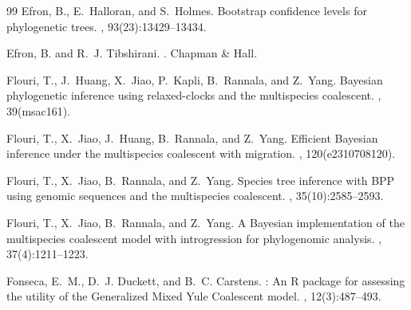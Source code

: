 \documentclass[12pt]{article}
\begin{document}
\begin{thebibliography}{99}
Efron, B., E.~Halloran, and S.~Holmes\leavevmode\nopagebreak{}.
\newblock Bootstrap confidence levels for phylogenetic trees.
, 93(23):13429--13434.

Efron, B. and R.~J. Tibshirani\leavevmode\nopagebreak{}.
.
\newblock Chapman \& Hall.

Flouri, T., J.~Huang, X.~Jiao, P.~Kapli, B.~Rannala, and
  Z.~Yang\leavevmode\nopagebreak{}.
\newblock Bayesian phylogenetic inference using relaxed-clocks and the
  multispecies coalescent.
, 39(msac161).

Flouri, T., X.~Jiao, J.~Huang, B.~Rannala, and
  Z.~Yang\leavevmode\nopagebreak{}.
\newblock Efficient {B}ayesian inference under the multispecies coalescent with
  migration.
, 120(e2310708120).

Flouri, T., X.~Jiao, B.~Rannala, and Z.~Yang\leavevmode\nopagebreak{}.
\newblock Species tree inference with {BPP} using genomic sequences and the
  multispecies coalescent.
, 35(10):2585--2593.

Flouri, T., X.~Jiao, B.~Rannala, and Z.~Yang\leavevmode\nopagebreak{}.
\newblock A {B}ayesian implementation of the multispecies coalescent model with
  introgression for phylogenomic analysis.
, 37(4):1211--1223.

Fonseca, E.~M., D.~J. Duckett, and B.~C.
  Carstens\leavevmode\nopagebreak{}.
: {A}n {R} package for assessing the utility of the
  {G}eneralized {M}ixed {Y}ule {C}oalescent model.
, 12(3):487--493.


\end{thebibliography}
\end{document}
